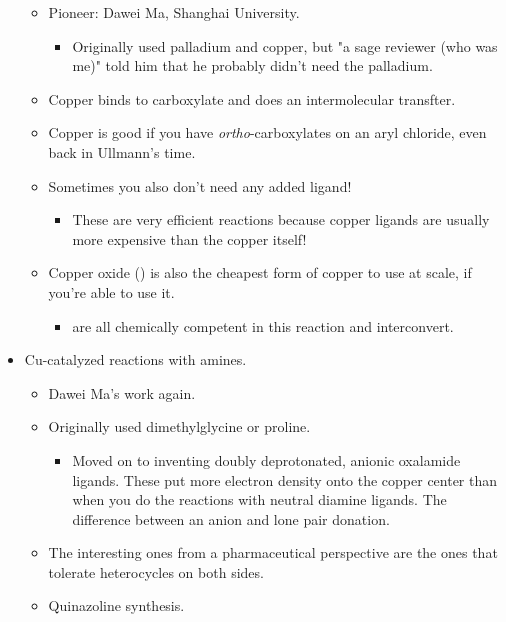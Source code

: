 \documentclass[../notes.tex]{subfiles}
\begin{document}
\begin{itemize}
    \begin{itemize}
        \item Pioneer: Dawei Ma, Shanghai University.
        \begin{itemize}
            \item Originally used palladium and copper, but "a sage reviewer (who was me)" told him that he probably didn't need the palladium.
        \end{itemize}
        \item Copper binds to carboxylate and does an intermolecular transfter.
        \item Copper is good if you have \emph{ortho}-carboxylates on an aryl chloride, even back in Ullmann's time.
        \item Sometimes you also don't need any added ligand!
        \begin{itemize}
            \item These are very efficient reactions because copper ligands are usually more expensive than the copper itself!
        \end{itemize}
        \item Copper oxide () is also the cheapest form of copper to use at scale, if you're able to use it.
        \begin{itemize}
            \item {} are all chemically competent in this reaction and interconvert.
        \end{itemize}
    \end{itemize}
    \item Cu-catalyzed  reactions with amines.
    \begin{itemize}
        \item Dawei Ma's work again.
        \item Originally used dimethylglycine or proline.
        \begin{itemize}
            \item Moved on to inventing doubly deprotonated, anionic oxalamide ligands. These put more electron density onto the copper center than when you do the reactions with neutral diamine ligands. The difference between an anion and lone pair donation.
        \end{itemize}
        \item The interesting ones from a pharmaceutical perspective are the ones that tolerate heterocycles on both sides.
        \item Quinazoline synthesis.

\end{itemize}
\end{itemize}
\end{document}
